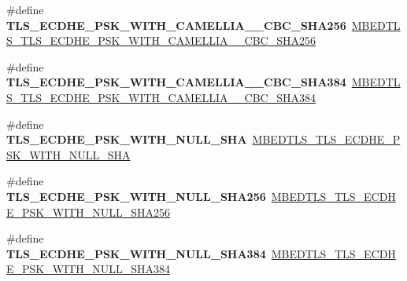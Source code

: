 \begin{DoxyCompactItemize}
\item 
\mbox{\label{compat-1_83_8h_a0351fc50dbe3d63ae06b4a6ff7c033a6}} 
\#define {\bfseries T\+L\+S\+\_\+\+E\+C\+D\+H\+E\+\_\+\+P\+S\+K\+\_\+\+W\+I\+T\+H\+\_\+\+C\+A\+M\+E\+L\+L\+I\+A\+\_\+\_\+\+C\+B\+C\+\_\+\+S\+H\+A256}~\mbox{\hyperlink{ssl__ciphersuites_8h_afcf557653ff7276108a9065d69f1a545}{M\+B\+E\+D\+T\+L\+S\+\_\+\+T\+L\+S\+\_\+\+E\+C\+D\+H\+E\+\_\+\+P\+S\+K\+\_\+\+W\+I\+T\+H\+\_\+\+C\+A\+M\+E\+L\+L\+I\+A\+\_\+\_\+\+C\+B\+C\+\_\+\+S\+H\+A256}}
\item 
\mbox{\label{compat-1_83_8h_a7c6422e9eb6a4cfcfa184af03f94f386}} 
\#define {\bfseries T\+L\+S\+\_\+\+E\+C\+D\+H\+E\+\_\+\+P\+S\+K\+\_\+\+W\+I\+T\+H\+\_\+\+C\+A\+M\+E\+L\+L\+I\+A\+\_\+\_\+\+C\+B\+C\+\_\+\+S\+H\+A384}~\mbox{\hyperlink{ssl__ciphersuites_8h_ae35802c1a888e90755ee8e644fb15ab0}{M\+B\+E\+D\+T\+L\+S\+\_\+\+T\+L\+S\+\_\+\+E\+C\+D\+H\+E\+\_\+\+P\+S\+K\+\_\+\+W\+I\+T\+H\+\_\+\+C\+A\+M\+E\+L\+L\+I\+A\+\_\+\_\+\+C\+B\+C\+\_\+\+S\+H\+A384}}
\item 
\mbox{\label{compat-1_83_8h_a8538f96aa91dc0c224b0d05b1836b9cb}} 
\#define {\bfseries T\+L\+S\+\_\+\+E\+C\+D\+H\+E\+\_\+\+P\+S\+K\+\_\+\+W\+I\+T\+H\+\_\+\+N\+U\+L\+L\+\_\+\+S\+HA}~\mbox{\hyperlink{ssl__ciphersuites_8h_a25faf3187de6a46f6acdc655d7c94a8f}{M\+B\+E\+D\+T\+L\+S\+\_\+\+T\+L\+S\+\_\+\+E\+C\+D\+H\+E\+\_\+\+P\+S\+K\+\_\+\+W\+I\+T\+H\+\_\+\+N\+U\+L\+L\+\_\+\+S\+HA}}
\item 
\mbox{\label{compat-1_83_8h_a3354aef4f250db8e5bdd6a6d5895df6c}} 
\#define {\bfseries T\+L\+S\+\_\+\+E\+C\+D\+H\+E\+\_\+\+P\+S\+K\+\_\+\+W\+I\+T\+H\+\_\+\+N\+U\+L\+L\+\_\+\+S\+H\+A256}~\mbox{\hyperlink{ssl__ciphersuites_8h_ac701c727d1c9f4bab4c07a4faa712d48}{M\+B\+E\+D\+T\+L\+S\+\_\+\+T\+L\+S\+\_\+\+E\+C\+D\+H\+E\+\_\+\+P\+S\+K\+\_\+\+W\+I\+T\+H\+\_\+\+N\+U\+L\+L\+\_\+\+S\+H\+A256}}
\item 
\mbox{\label{compat-1_83_8h_a02eef432c766622e852a0e5ffbc36d3c}} 
\#define {\bfseries T\+L\+S\+\_\+\+E\+C\+D\+H\+E\+\_\+\+P\+S\+K\+\_\+\+W\+I\+T\+H\+\_\+\+N\+U\+L\+L\+\_\+\+S\+H\+A384}~\mbox{\hyperlink{ssl__ciphersuites_8h_a101125135f27cb15a59db289ec1a9705}{M\+B\+E\+D\+T\+L\+S\+\_\+\+T\+L\+S\+\_\+\+E\+C\+D\+H\+E\+\_\+\+P\+S\+K\+\_\+\+W\+I\+T\+H\+\_\+\+N\+U\+L\+L\+\_\+\+S\+H\+A384}}
\item 

\end{DoxyCompactItemize}
